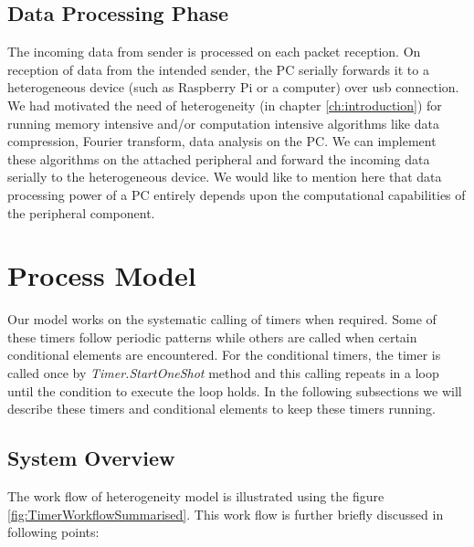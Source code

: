 	\subsection{Data Processing Phase}
	
    The incoming data from sender is processed on each packet reception. On reception of data from the intended sender, the \ac{PC} serially forwards it to a heterogeneous device (such as Raspberry Pi or a computer) over usb connection. We had motivated the need of heterogeneity (in chapter \ref{ch:introduction}) for running memory intensive and/or computation intensive algorithms like data compression, Fourier transform, data analysis on the \ac{PC}. We can implement these algorithms on the attached peripheral and forward the incoming data serially to the heterogeneous device. We would like to mention here that data processing power of a \ac{PC} entirely depends upon the computational capabilities of the peripheral component.

\section{Process Model}\label{sec:processModel}

Our model works on the systematic calling of timers when required. Some of these timers follow periodic patterns while others are called when certain conditional elements are encountered. For the conditional timers, the timer is called once by \textit{Timer.StartOneShot} method and this calling repeats in a loop until the condition to execute the loop holds. In the following subsections we will describe these timers and conditional elements to keep these timers running.

	\subsection{System Overview}
	
	The work flow of heterogeneity model is illustrated using the figure \ref{fig:TimerWorkflowSummarised}. This work flow is further briefly discussed in following points:
	
